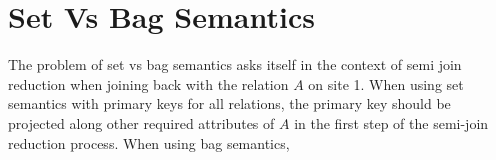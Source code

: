 \documentclass[11pt]{article}
\begin{document}
\section*{Set Vs Bag Semantics}
The problem of set vs bag semantics asks itself in the context of semi join reduction when joining back with the relation $A$ on site 1. When using set semantics with primary keys for all relations, the primary key should be projected along other required attributes of $A$ in the first step of the semi-join reduction process. When using bag semantics, 
\end{document}
